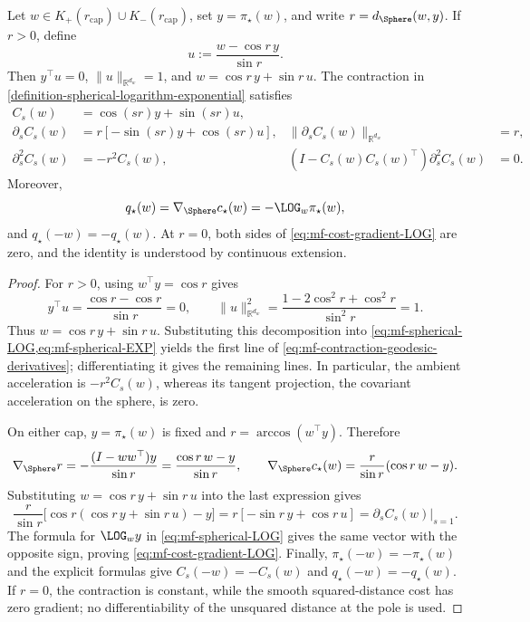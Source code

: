 \begin{lemma}
\label{lem:fixed-assignment-contraction-geometry}
Let \(w\in K_+(r_{\mathrm{cap}})\cup K_-(r_{\mathrm{cap}})\), set
\(y=\pi_\star(w)\), and write \(r=d_\Sphere(w,y)\).  If \(r>0\), define
\[
 u:=\frac{w-\cos r\,y}{\sin r}.
\]
Then \(y^\top u=0\), \(\|u\|_{\mathbb R^{d_w}}=1\), and
\(w=\cos r\,y+\sin r\,u\).  The contraction in
\cref{definition-spherical-logarithm-exponential} satisfies
\begin{equation}
\label{eq:mf-contraction-geodesic-derivatives}
\begin{aligned}
 C_s(w)&=\cos(sr)y+\sin(sr)u,\\
 \partial_s C_s(w)&=r[-\sin(sr)y+\cos(sr)u],
 &\|\partial_s C_s(w)\|_{\mathbb R^{d_w}}&=r,\\
 \partial_s^2 C_s(w)&=-r^2C_s(w),
 &(I-C_s(w)C_s(w)^\top)\partial_s^2 C_s(w)&=0.
\end{aligned}
\end{equation}
Moreover,
\begin{equation}
\label{eq:mf-cost-gradient-LOG}
 q_\star(w)=\nabla_\Sphere c_\star(w)=-\LOG_w\pi_\star(w),
\end{equation}
and \(q_\star(-w)=-q_\star(w)\).  At \(r=0\), both sides of
\cref{eq:mf-cost-gradient-LOG} are zero, and the identity is understood by
continuous extension.
\end{lemma}

\begin{proof}
For \(r>0\), using \(w^\top y=\cos r\) gives
\[
 y^\top u=\frac{\cos r-\cos r}{\sin r}=0,
 \qquad
 \|u\|_{\mathbb R^{d_w}}^2
 =\frac{1-2\cos^2r+\cos^2r}{\sin^2r}=1.
\]
Thus \(w=\cos r\,y+\sin r\,u\).  Substituting this decomposition into
\cref{eq:mf-spherical-LOG,eq:mf-spherical-EXP} yields the first line of
\cref{eq:mf-contraction-geodesic-derivatives}; differentiating it gives the
remaining lines.  In particular, the ambient acceleration is
\(-r^2C_s(w)\), whereas its tangent projection, the covariant acceleration
on the sphere, is zero.

On either cap, \(y=\pi_\star(w)\) is fixed and
\(r=\arccos(w^\top y)\).  Therefore
\[
 \nabla_\Sphere r
 =-\frac{(I-ww^\top)y}{\sin r}
 =\frac{\cos r\,w-y}{\sin r},
 \qquad
 \nabla_\Sphere c_\star(w)
 =\frac r{\sin r}(\cos r\,w-y).
\]
Substituting \(w=\cos r\,y+\sin r\,u\) into the last expression gives
\[
 \frac r{\sin r}\bigl[\cos r(\cos r\,y+\sin r\,u)-y\bigr]
 =r[-\sin r\,y+\cos r\,u]
 =\left.\partial_sC_s(w)\right|_{s=1}.
\]
The formula for \(\LOG_wy\) in \cref{eq:mf-spherical-LOG} gives the same
vector with the opposite sign, proving \cref{eq:mf-cost-gradient-LOG}.
Finally, \(\pi_\star(-w)=-\pi_\star(w)\) and the explicit formulas give
\(C_s(-w)=-C_s(w)\) and \(q_\star(-w)=-q_\star(w)\).  If \(r=0\), the
contraction is constant, while the smooth squared-distance cost has zero
gradient; no differentiability of the unsquared distance at the pole is used.
\end{proof}

